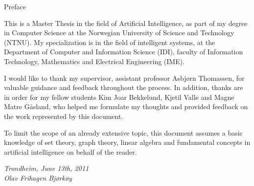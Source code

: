 \null\vspace{8em}
{
  \centering
  \normalfont
  \huge
  Preface\\
}
\vspace{2em}

\noindent
This is a Master Thesis in the field of Artificial Intelligence,
as part of my degree in Computer Science
at the Norwegian University of Science and Technology (NTNU).
My specialization is in the field of intelligent systems, 
at the Department of Computer and Information Science (IDI), 
faculty of Information Technology, Mathematics and Electrical Engineering (IME).

I would like to thank my supervisor, assistant professor Asbjørn Thomassen, for valuable guidance and feedback throughout the process.
In addition, thanks are in order for my fellow students 
Kim Joar Bekkelund, Kjetil Valle and Magne Matre Gåsland,
who helped me formulate my thoughts and provided feedback on the work represented by this document.

To limit the scope of an already extensive topic, 
this document assumes a basic knowledge of set theory, 
graph theory, linear algebra and fundamental concepts in artificial intelligence 
on behalf of the reader.

\vspace{1em}
\begin{flushleft}
  \color{red}
  \itshape
  \hspace{2.5em}Trondheim, June 13th, 2011\\
  \hspace{2.5em}Olav Frihagen Bjørkøy\\
\end{flushleft}

\clearpage

